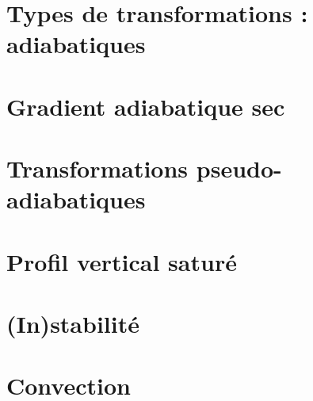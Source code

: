 \documentclass[a4paper,DIV16,10pt]{scrartcl}
\begin{document}
\newpage
\section{Types de transformations : adiabatiques}


\newpage
\section{Gradient adiabatique sec}


\newpage
\section{Transformations pseudo-adiabatiques}


\newpage
\section{Profil vertical saturé}


\newpage
\section{(In)stabilité}


\newpage
\section{Convection}

\end{document}
